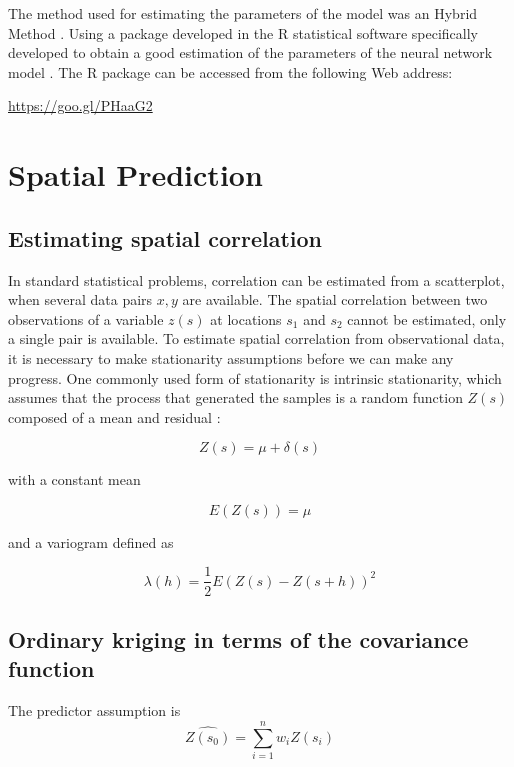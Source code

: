 \documentclass[11pt,twoside]{rmta2010esp}%
\begin{document}
The method used for estimating the parameters of the model was an Hybrid Method \cite{McNelis2005}. Using a package developed in the R statistical software \cite{rproject} specifically developed to obtain a good estimation of the parameters of the neural network model . The R package can be accessed from the following Web address:
 
\url{https://goo.gl/PHaaG2}




\section{Spatial Prediction}

\subsection*{Estimating spatial correlation}

In standard statistical problems, correlation can be estimated from a scatterplot, when several data pairs ${x, y}$ are available. The spatial correlation between two observations of a variable $z(s)$ at locations $s_{1}$ and $s_{2}$ cannot be estimated, only a single pair is available. To estimate spatial correlation
from observational data, it is necessary to make stationarity assumptions
before we can make any progress. One commonly used form of stationarity
is intrinsic stationarity, which assumes that the process that generated the
samples is a random function $Z(s)$ composed of a mean and residual \cite{bivand2008applied}:

\begin{equation}
Z(s) = \mu + \delta(s)
\end{equation}

with a constant mean 

\begin{equation}
E\left(Z(s)\right) = \mu
\end{equation}

and a variogram defined as 

\begin{equation}
\lambda(h) = \frac{1}{2}E\left(Z(s) - Z(s+h)\right)^{2}
\end{equation}


\subsection*{Ordinary kriging in terms of the covariance function}
The predictor assumption is 
\begin{equation}
\hat{Z(s_{0})} = \sum_{i=1}^{n} w_{i}Z(s_{i})
\end{equation}
\end{document}
